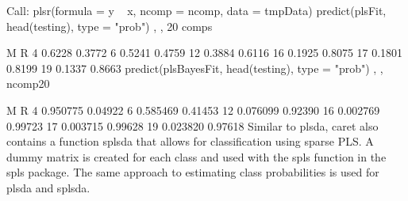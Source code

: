 Call:
plsr(formula = y ~ x, ncomp = ncomp, data = tmpData)
predict(plsFit, head(testing), type = "prob")
, , 20 comps

        M      R
4  0.6228 0.3772
6  0.5241 0.4759
12 0.3884 0.6116
16 0.1925 0.8075
17 0.1801 0.8199
19 0.1337 0.8663
predict(plsBayesFit, head(testing), type = "prob")
, , ncomp20

          M       R
4  0.950775 0.04922
6  0.585469 0.41453
12 0.076099 0.92390
16 0.002769 0.99723
17 0.003715 0.99628
19 0.023820 0.97618
Similar to plsda, caret also contains a function splsda that allows for classification using sparse PLS. A dummy matrix is created for each class and used with the spls function in the spls package. The same approach to estimating class probabilities is used for plsda and splsda.
